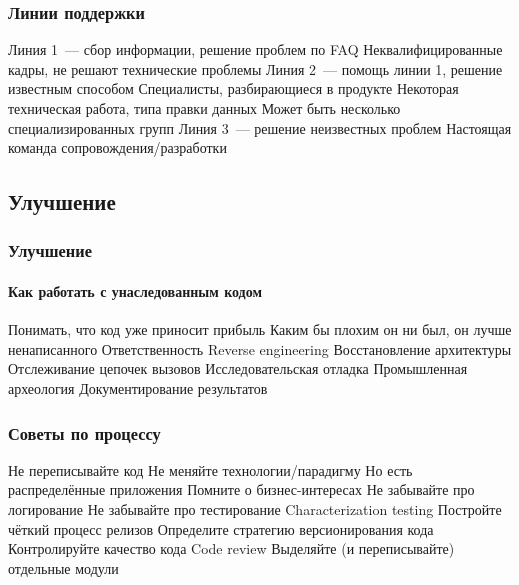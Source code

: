 \documentclass{../../slides-style}
\begin{document}
    \begin{frame}
        \frametitle{Линии поддержки}
        \begin{outline}
            \1 Линия 1~--- сбор информации, решение проблем по FAQ
                \2 Неквалифицированные кадры, не решают технические проблемы
            \1 Линия 2~--- помощь линии 1, решение известным способом
                \2 Специалисты, разбирающиеся в продукте
                \2 Некоторая техническая работа, типа правки данных
                \2 Может быть несколько специализированных групп
            \1 Линия 3~--- решение неизвестных проблем
                \2 Настоящая команда сопровождения/разработки
        \end{outline}
    \end{frame}

    \subsection{Улучшение}

    \begin{frame}
        \frametitle{Улучшение}
        \framesubtitle{Как работать с унаследованным кодом}
        \begin{outline}
            \1 Понимать, что код уже приносит прибыль
                \2 Каким бы плохим он ни был, он лучше ненаписанного
                \2 Ответственность
            \1 Reverse engineering
                \2 Восстановление архитектуры
                \2 Отслеживание цепочек вызовов
                \2 Исследовательская отладка
                \2 Промышленная археология
                \2 Документирование результатов
        \end{outline}
    \end{frame}

    \begin{frame}
        \frametitle{Советы по процессу}
        \begin{outline}
            \1 Не переписывайте код
            \1 Не меняйте технологии/парадигму
                \2 Но есть распределённые приложения
            \1 Помните о бизнес-интересах
            \1 Не забывайте про логирование
            \1 Не забывайте про тестирование
                \2 Characterization testing
            \1 Постройте чёткий процесс релизов
            \1 Определите стратегию версионирования кода
            \1 Контролируйте качество кода
                \2 Code review
            \1 Выделяйте (и переписывайте) отдельные модули
        \end{outline}
    \end{frame}
\end{document}

